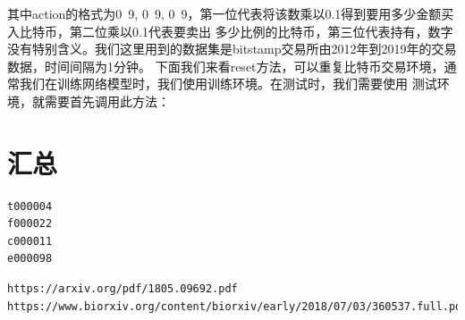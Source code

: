 \documentclass{article}
\begin{document}
其中action的格式为{0~9, 0~9, 0~9}，第一位代表将该数乘以0.1得到要用多少金额买入比特币，第二位乘以0.1代表要卖出
多少比例的比特币，第三位代表持有，数字没有特别含义。我们这里用到的数据集是bitstamp交易所由2012年到2019年的交易
数据，时间间隔为1分钟。\newline
下面我们来看reset方法，可以重复比特币交易环境，通常我们在训练网络模型时，我们使用训练环境。在测试时，我们需要使用
测试环境，就需要首先调用此方法：









\section{汇总}
\begin{lstlisting}
t000004
f000022
c000011
e000098
\end{lstlisting}



\begin{lstlisting}
https://arxiv.org/pdf/1805.09692.pdf
https://www.biorxiv.org/content/biorxiv/early/2018/07/03/360537.full.pdf
\end{lstlisting}





\newpage




\appendix
\end{document}
